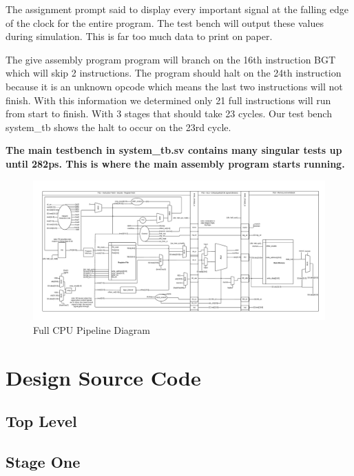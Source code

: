 	    The assignment prompt said to display every important signal at the falling
	    edge of the clock for the entire program. The test bench will output these values
	    during simulation. This is far too much data to print on paper.
	     
	    The give assembly program program will branch on the 16th instruction BGT which will skip 2 instructions. The program should halt on the 24th instruction because it is an unknown
	    opcode which means the last two instructions will not finish.
	    With this information we determined only 21 full instructions will run from start to finish. With 3 stages that should take 23 cycles.
	    Our test bench system\_tb shows the halt to occur on the 23rd cycle. 

        \textbf{The main testbench in system\_tb.sv contains many singular tests up until 282ps. This is where the main assembly program starts running. }

    \newpage  
    \begin{figure}[htpb]
        \centering
        \includegraphics[angle=90,width=.63\textwidth]{./figures/142.pdf}
        \caption{Full CPU Pipeline Diagram}
        \label{fullschematic}
    \end{figure}
    \FloatBarrier
	\onecolumn

    \section{Design Source Code}
        \subsection{Top Level}
        
        
        

        \subsection{Stage One}
        
        
        
        
              
        
        
        
        
        
        
        
              
        

